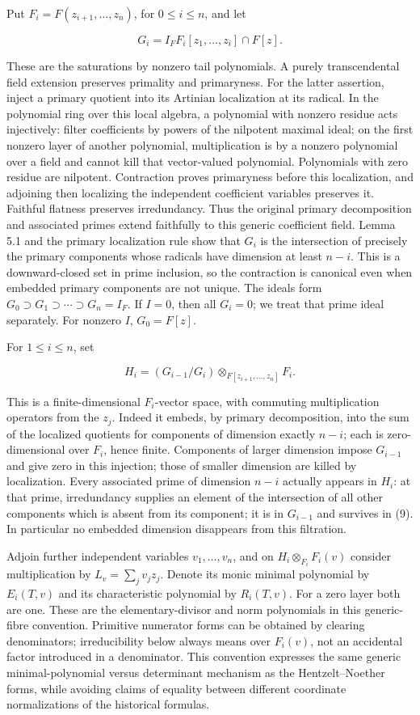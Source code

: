 \documentclass[
]{article}
\begin{document}
Put \(F_i=F(z_{i+1},\ldots,z_n)\), for \(0\le i\le n\), and let

\[
G_i=I_F F_i[z_1,\ldots,z_i]\cap F[z].
\]

These are the saturations by nonzero tail polynomials. A purely
transcendental field extension preserves primality and primaryness. For
the latter assertion, inject a primary quotient into its Artinian
localization at its radical. In the polynomial ring over this local
algebra, a polynomial with nonzero residue acts injectively: filter
coefficients by powers of the nilpotent maximal ideal; on the first
nonzero layer of another polynomial, multiplication is by a nonzero
polynomial over a field and cannot kill that vector-valued polynomial.
Polynomials with zero residue are nilpotent. Contraction proves
primaryness before this localization, and adjoining then localizing the
independent coefficient variables preserves it. Faithful flatness
preserves irredundancy. Thus the original primary decomposition and
associated primes extend faithfully to this generic coefficient field.
Lemma 5.1 and the primary localization rule show that \(G_i\) is the
intersection of precisely the primary components whose radicals have
dimension at least \(n-i\). This is a downward-closed set in prime
inclusion, so the contraction is canonical even when embedded primary
components are not unique. The ideals form
\(G_0\supset G_1\supset\cdots\supset G_n=I_F\). If \(I=0\), then all
\(G_i=0\); we treat that prime ideal separately. For nonzero \(I\),
\(G_0=F[z]\).

For \(1\le i\le n\), set

\[
H_i=(G_{i-1}/G_i)\otimes_{F[z_{i+1},\ldots,z_n]}F_i.
\tag{9}
\]

This is a finite-dimensional \(F_i\)-vector space, with commuting
multiplication operators from the \(z_j\). Indeed it embeds, by primary
decomposition, into the sum of the localized quotients for components of
dimension exactly \(n-i\); each is zero-dimensional over \(F_i\), hence
finite. Components of larger dimension impose \(G_{i-1}\) and give zero
in this injection; those of smaller dimension are killed by
localization. Every associated prime of dimension \(n-i\) actually
appears in \(H_i\): at that prime, irredundancy supplies an element of
the intersection of all other components which is absent from its
component; it is in \(G_{i-1}\) and survives in (9). In particular no
embedded dimension disappears from this filtration.

Adjoin further independent variables \(v_1,\ldots,v_n\), and on
\(H_i\otimes_{F_i}F_i(v)\) consider multiplication by
\(L_v=\sum_jv_jz_j\). Denote its monic minimal polynomial by
\(E_i(T,v)\) and its characteristic polynomial by \(R_i(T,v)\). For a
zero layer both are one. These are the elementary-divisor and norm
polynomials in this generic-fibre convention. Primitive numerator forms
can be obtained by clearing denominators; irreducibility below always
means over \(F_i(v)\), not an accidental factor introduced in a
denominator. This convention expresses the same generic
minimal-polynomial versus determinant mechanism as the Hentzelt--Noether
forms, while avoiding claims of equality between different coordinate
normalizations of the historical formulas.
\end{document}
